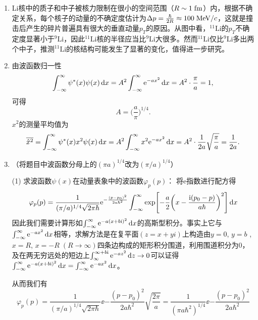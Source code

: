 \begin{enumerate}[label=2.\arabic*, leftmargin=-0.5mm]
\item
Li核中的质子和中子被核力限制在很小的空间范围（$R\sim 1\;\mathrm{fm}$）内，根据不确定关系，每个核子的动量的不确定度估计为$\Delta p = \frac{\hbar}{2R} \approx 100\;\mathrm{MeV}/c$，这就是撞击后产生的碎片普遍具有很大的垂直动量$p_T$的原因。从图中看，$^{11}\mathrm{Li}$的$p_T$不确定度显著小于$^9\mathrm{Li}$，因此$^{11}\mathrm{Li}$核的半径应当比$^9\mathrm{Li}$大很多。然而$^{11}\mathrm{Li}$仅比$^9\mathrm{Li}$多出两个中子，推测$^{11}\mathrm{Li}$的核结构可能发生了显著的变化，值得进一步研究。

\item
由波函数归一性
\[\int_{-\infty}^\infty \psi^*(x)\psi(x)\dd{x} = A^2 \int_{-\infty}^\infty \mathrm{e}^{-ax^2}\dd{x} = A^2\cdot \frac{\pi}{a} = 1,\]
可得
\[A=\Big(\frac{a}{\pi}\Big)^{1/4}.\]
$x^2$的测量平均值为
\[\overline{\hat{x}^2} = \int_{-\infty}^\infty \psi^*(x)x^2\psi(x)\dd{x} = A^2\int_{-\infty}^\infty x^2 \mathrm{e}^{-ax^2}\dd{x}= A^2\cdot\frac{1}{2a}\sqrt{\frac{\pi}{a}}= \frac{1}{2a}.\]

\item
（将题目中波函数分母上的$(\pi a)^{1/4}$改为$(\pi/a)^{1/4}$）

(1) 求波函数$\psi(x)$在动量表象中的波函数$\varphi_p(p)$：
将e指数进行配方得
\[\varphi_p(p)= \frac{1}{(\pi/a)^{1/4}\sqrt{2\pi\hbar}}\mathrm{e}^{-\frac{(p-p_0)^2}{2a\hbar^2}}  \int_{-\infty}^\infty  \exp[-\frac{a}{2}\qty(x - \frac{\mathrm{i}(p_0-p)}{a\hbar})^2] \dd{x}
\]
因此我们需要计算形如$\int_{-\infty}^\infty \mathrm{e}^{-a(x+b\mathrm{i})^2}\dd{x}$的高斯型积分。事实上它与$\int_{-\infty}^\infty \mathrm{e}^{-ax^2}\dd{x}$相等，求解方法是在复平面$(z=x+yi)$上构造由$y=0$, $y=b$ , $x=R$, $x=-R\;(R\rightarrow \infty)$四条边构成的矩形积分围道，利用围道积分为0，及在两无穷远处的短边上$\int_{\infty}^{\infty+b\mathrm{i}} \mathrm{e}^{-az^2}\dd{z}\rightarrow 0$可以证得$\int_{-\infty}^\infty \mathrm{e}^{-a(x+b\mathrm{i})^2}\dd{x} = \int_{-\infty}^\infty \mathrm{e}^{-ax^2}\dd{x}$。

从而我们有
\[\varphi_p(p) = \frac{1}{(\pi/a)^{1/4}\sqrt{2\pi\hbar}}\ee{-\frac{(p-p_0)^2}{2a\hbar^2}}\sqrt{\frac{2\pi}{a}} =\frac{1}{(\pi a \hbar^2)^{1/4}}\ee{-\frac{(p-p_0)^2}{2a\hbar^2}}\]


\end{enumerate}
